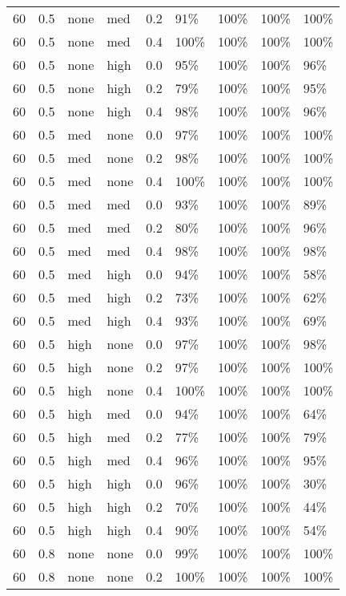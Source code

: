 \begin{longtable}{rrllrllll}
  60 & 0.5 & none & med & 0.2 & 91\% & 100\% & 100\% & 100\% \\ 
  60 & 0.5 & none & med & 0.4 & 100\% & 100\% & 100\% & 100\% \\ 
  60 & 0.5 & none & high & 0.0 & 95\% & 100\% & 100\% & 96\% \\ 
  60 & 0.5 & none & high & 0.2 & 79\% & 100\% & 100\% & 95\% \\ 
  60 & 0.5 & none & high & 0.4 & 98\% & 100\% & 100\% & 96\% \\ 
  60 & 0.5 & med & none & 0.0 & 97\% & 100\% & 100\% & 100\% \\ 
  60 & 0.5 & med & none & 0.2 & 98\% & 100\% & 100\% & 100\% \\ 
  60 & 0.5 & med & none & 0.4 & 100\% & 100\% & 100\% & 100\% \\ 
  60 & 0.5 & med & med & 0.0 & 93\% & 100\% & 100\% & 89\% \\ 
  60 & 0.5 & med & med & 0.2 & 80\% & 100\% & 100\% & 96\% \\ 
  60 & 0.5 & med & med & 0.4 & 98\% & 100\% & 100\% & 98\% \\ 
  60 & 0.5 & med & high & 0.0 & 94\% & 100\% & 100\% & 58\% \\ 
  60 & 0.5 & med & high & 0.2 & 73\% & 100\% & 100\% & 62\% \\ 
  60 & 0.5 & med & high & 0.4 & 93\% & 100\% & 100\% & 69\% \\ 
  60 & 0.5 & high & none & 0.0 & 97\% & 100\% & 100\% & 98\% \\ 
  60 & 0.5 & high & none & 0.2 & 97\% & 100\% & 100\% & 100\% \\ 
  60 & 0.5 & high & none & 0.4 & 100\% & 100\% & 100\% & 100\% \\ 
  60 & 0.5 & high & med & 0.0 & 94\% & 100\% & 100\% & 64\% \\ 
  60 & 0.5 & high & med & 0.2 & 77\% & 100\% & 100\% & 79\% \\ 
  60 & 0.5 & high & med & 0.4 & 96\% & 100\% & 100\% & 95\% \\ 
  60 & 0.5 & high & high & 0.0 & 96\% & 100\% & 100\% & 30\% \\ 
  60 & 0.5 & high & high & 0.2 & 70\% & 100\% & 100\% & 44\% \\ 
  60 & 0.5 & high & high & 0.4 & 90\% & 100\% & 100\% & 54\% \\ 
  60 & 0.8 & none & none & 0.0 & 99\% & 100\% & 100\% & 100\% \\ 
  60 & 0.8 & none & none & 0.2 & 100\% & 100\% & 100\% & 100\% \\ 

\end{longtable}
